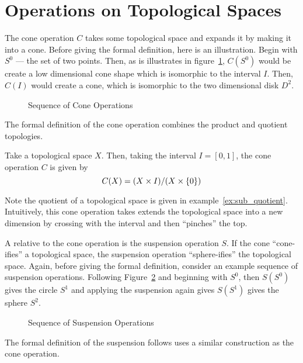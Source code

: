 \documentclass[../sean_thesis.tex]{subfiles}
\begin{document}
\section{Operations on Topological Spaces}

The cone operation $C$ takes some topological space and expands it by making it into a cone. Before giving the formal definition, here is an illustration. Begin with  $S^0$ --- the set of two points. Then, as is illustrates in figure~\ref{fig:cone}, $C(S^0)$ would be create a low dimensional cone shape which is isomorphic to the interval $I$. Then, $C(I)$ would create a cone, which is isomorphic to the two dimensional disk $D^2$.

\begin{figure}
	\caption{Sequence of Cone Operations}
	\label{fig:cone}
\end{figure}
 
The formal definition of the cone operation combines the product and quotient topologies.
\begin{definition}
	Take a topological space $X$. Then, taking the interval $I = [0,1]$, the cone operation $C$ is given by
	\begin{equation*}
		C(X) = (X \times I)/(X \times \left\{0\right\})
	\end{equation*}
\end{definition}
Note the quotient of a topological space is given in example~\ref{ex:sub_quotient}. Intuitively, this cone operation takes extends the topological space into a new dimension by crossing with the interval and then ``pinches'' the top.
 
A relative to the cone operation is the suspension operation $S$. If the cone ``cone-ifies'' a topological space, the suspension operation ``sphere-ifies'' the topological space. Again, before giving the formal definition, consider an example sequence of suspension operations. Following Figure~\ref{fig:suspension} and beginning with $S^0$, then $S(S^0)$ gives the circle $S^1$ and applying the suspension again gives $S(S^1)$ gives the sphere $S^2$.

\begin{figure}
\caption{Sequence of Suspension Operations}
\label{fig:suspension}
\end{figure}

The formal definition of the suspension follows uses a similar construction as the cone operation.
\end{document}
